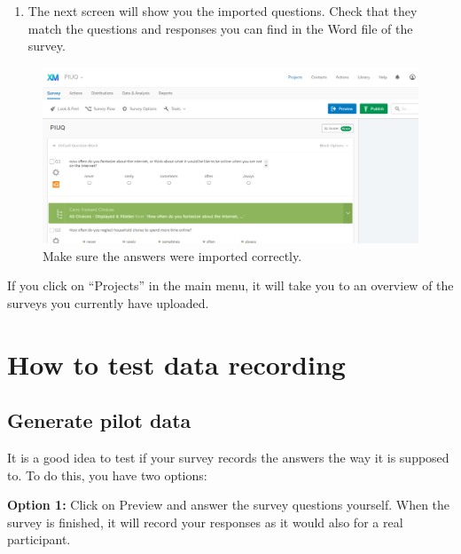 \documentclass[
]{book}
\providecommand{\tightlist}{%
  \setlength{\itemsep}{0pt}\setlength{\parskip}{0pt}}
\begin{document}
\begin{enumerate}
\def\labelenumi{\arabic{enumi}.}
\setcounter{enumi}{5}
\tightlist
\item
  The next screen will show you the imported questions. Check that they match the questions and responses you can find in the Word file of the survey.
\end{enumerate}

\begin{figure}

{\centering \includegraphics[width=0.85\linewidth]{images/Qualtrics/07Done} 

}

\caption{Make sure the answers were imported correctly.}\label{fig:Figure11-6}
\end{figure}

If you click on ``Projects'' in the main menu, it will take you to an overview of the surveys you currently have uploaded.

\hypertarget{how-to-test-data-recording}{%
\section{How to test data recording}\label{how-to-test-data-recording}}

\hypertarget{generate-pilot-data}{%
\subsection{Generate pilot data}\label{generate-pilot-data}}

It is a good idea to test if your survey records the answers the way it is supposed to. To do this, you have two options:

\textbf{Option 1:} Click on Preview and answer the survey questions yourself. When the survey is finished, it will record your responses as it would also for a real participant.
\end{document}
